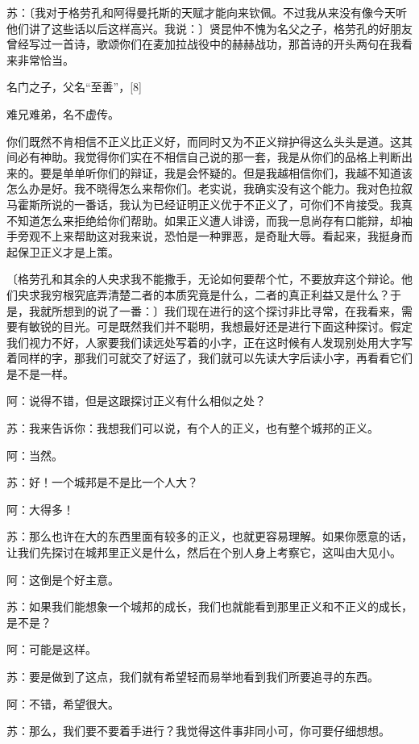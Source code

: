 \documentclass[12pt,oneside]{book}
\begin{document}
苏：〔我对于格劳孔和阿得曼托斯的天赋才能向来钦佩。不过我从来没有像今天听他们讲了这些话以后这样高兴。我说：〕贤昆仲不愧为名父之子，格劳孔的好朋友曾经写过一首诗，歌颂你们在麦加拉战役中的赫赫战功，那首诗的开头两句在我看来非常恰当。





名门之子，父名“至善”，[8]

难兄难弟，名不虚传。





你们既然不肯相信不正义比正义好，而同时又为不正义辩护得这么头头是道。这其间必有神助。我觉得你们实在不相信自己说的那一套，我是从你们的品格上判断出来的。要是单单听你们的辩证，我是会怀疑的。但是我越相信你们，我越不知道该怎么办是好。我不晓得怎么来帮你们。老实说，我确实没有这个能力。我对色拉叙马霍斯所说的一番话，我认为已经证明正义优于不正义了，可你们不肯接受。我真不知道怎么来拒绝给你们帮助。如果正义遭人诽谤，而我一息尚存有口能辩，却袖手旁观不上来帮助这对我来说，恐怕是一种罪恶，是奇耻大辱。看起来，我挺身而起保卫正义才是上策。

〔格劳孔和其余的人央求我不能撒手，无论如何要帮个忙，不要放弃这个辩论。他们央求我穷根究底弄清楚二者的本质究竟是什么，二者的真正利益又是什么？于是，我就所想到的说了一番：〕我们现在进行的这个探讨非比寻常，在我看来，需要有敏锐的目光。可是既然我们并不聪明，我想最好还是进行下面这种探讨。假定我们视力不好，人家要我们读远处写着的小字，正在这时候有人发现别处用大字写着同样的字，那我们可就交了好运了，我们就可以先读大字后读小字，再看看它们是不是一样。

阿：说得不错，但是这跟探讨正义有什么相似之处？

苏：我来告诉你：我想我们可以说，有个人的正义，也有整个城邦的正义。

阿：当然。

苏：好！一个城邦是不是比一个人大？

阿：大得多！

苏：那么也许在大的东西里面有较多的正义，也就更容易理解。如果你愿意的话，让我们先探讨在城邦里正义是什么，然后在个别人身上考察它，这叫由大见小。

阿：这倒是个好主意。

苏：如果我们能想象一个城邦的成长，我们也就能看到那里正义和不正义的成长，是不是？

阿：可能是这样。

苏：要是做到了这点，我们就有希望轻而易举地看到我们所要追寻的东西。

阿：不错，希望很大。

苏：那么，我们要不要着手进行？我觉得这件事非同小可，你可要仔细想想。
\end{document}
